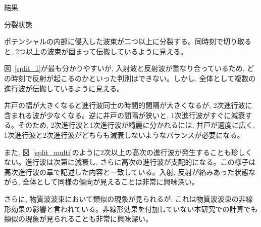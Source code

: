 \documentclass[a4paper, lualatex]{bxjsarticle}
\newcommand{\fref}[1]{図~\ref{#1}}
\begin{document}
\begin{section}{結果}
\begin{subsection}{分裂状態}
    \par ポテンシャルの内部に侵入した波束が二つ以上に分裂する。同時刻で切り取ると, 2つ以上の波束が固まって伝搬しているように見える。
    \par \fref{split_1}が最も分かりやすいが, 入射波と反射波が重なり合っているため, どの時刻で反射が起こるのかといった判別はできない。しかし, 全体として複数の進行波が伝搬しているように見える。
    \par 井戸の幅が大きくなると進行波同士の時間的間隔が大きくなるが, 2次進行波に含まれる波が少なくなる。逆に井戸の間隔が狭いと, 1次進行波がすぐに減衰する。そのため, 2次進行波と1次進行波が綺麗に分かれるには, 井戸が適度に広く, 1次進行波と2次進行波がどちらも減衰しないようなバランスが必要になる。
    \par また, \fref{split_multi}のように2次以上の高次の進行波が発生することも珍しくない。進行波は次第に減衰し, さらに高次の進行波が支配的になる。この様子は高次進行波の章で記述した内容と一致している。入射, 反射が絡みあった状態ながら, 全体として同様の傾向が見えることは非常に興味深い。
    \par さらに, 物質波波束において類似の現象が見られる\cite{Anker}が, これは物質波波束の非線形効果の影響と言われている。非線形効果を付加していない本研究での計算でも類似の現象が見られることも非常に興味深い。
    \end{subsection}


\end{section}
\end{document}
